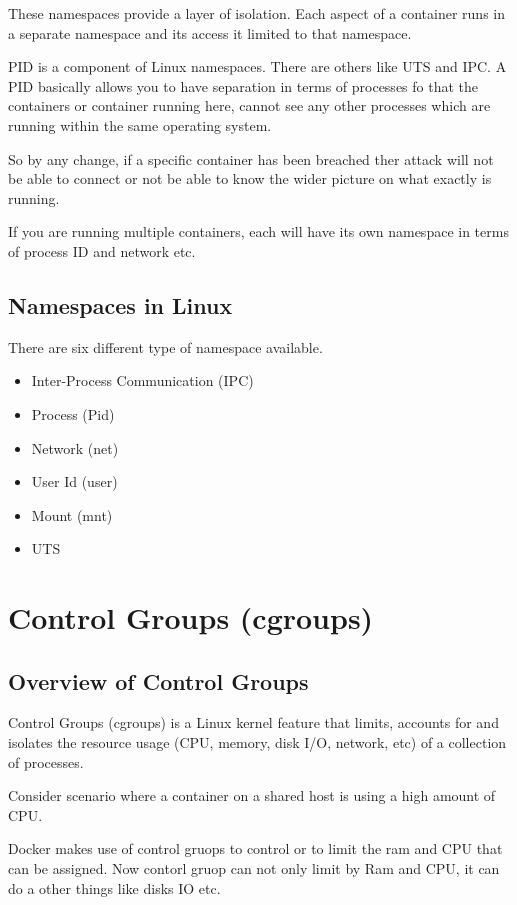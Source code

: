 \documentclass[11pt]{book}
\begin{document}
    These namespaces provide a layer of isolation. Each aspect of a container runs in a separate namespace and its access it limited to that namespace.

    PID is a component of Linux namespaces. There are others like UTS and IPC.
    A PID basically allows you to have separation in terms of processes fo that the containers or container running here, cannot see any other processes which are running within the same operating system.

    So by any change, if a specific container has been breached ther attack will not be able to connect or not be able to know the wider picture on what exactly is running.

    If you are running multiple containers, each will have its own namespace in terms of process ID and network etc.

    \subsection{Namespaces in Linux}
    There are six different type of namespace available.
    \begin{itemize}
        \item Inter-Process Communication (IPC)
        \item Process (Pid)
        \item Network (net)
        \item User Id (user)
        \item Mount (mnt)
        \item UTS
    \end{itemize}

    \section{Control Groups (cgroups)}
    \subsection{Overview of Control Groups}
    Control Groups (cgroups) is a Linux kernel feature that limits, accounts for and isolates the resource usage
    (CPU, memory, disk I/O, network, etc) of a collection of processes.


    Consider scenario where a container on a shared host is using a high amount of CPU.

    Docker makes use of control gruops to control or to limit the ram and CPU that can be assigned.
    Now contorl gruop can not only limit by Ram and CPU, it can do a other things like disks IO etc.
\end{document}
